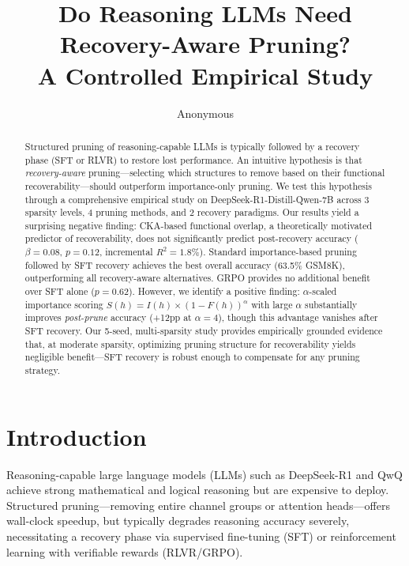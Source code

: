 \documentclass[11pt,a4paper]{article}
\title{Do Reasoning LLMs Need Recovery-Aware Pruning?\\A Controlled Empirical Study}
\author{Anonymous}
\begin{document}
\maketitle

\begin{abstract}
Structured pruning of reasoning-capable LLMs is typically followed by a recovery phase (SFT or RLVR) to restore lost performance. An intuitive hypothesis is that \emph{recovery-aware} pruning---selecting which structures to remove based on their functional recoverability---should outperform importance-only pruning. We test this hypothesis through a comprehensive empirical study on DeepSeek-R1-Distill-Qwen-7B across 3 sparsity levels, 4 pruning methods, and 2 recovery paradigms. Our results yield a surprising negative finding: CKA-based functional overlap, a theoretically motivated predictor of recoverability, does not significantly predict post-recovery accuracy ($\beta=0.08$, $p=0.12$, incremental $R^2=1.8\%$). Standard importance-based pruning followed by SFT recovery achieves the best overall accuracy (63.5\% GSM8K), outperforming all recovery-aware alternatives. GRPO provides no additional benefit over SFT alone ($p=0.62$). However, we identify a positive finding: $\alpha$-scaled importance scoring $S(h)=I(h)\times(1{-}F(h))^\alpha$ with large $\alpha$ substantially improves \emph{post-prune} accuracy (+12pp at $\alpha{=}4$), though this advantage vanishes after SFT recovery. Our 5-seed, multi-sparsity study provides empirically grounded evidence that, at moderate sparsity, optimizing pruning structure for recoverability yields negligible benefit---SFT recovery is robust enough to compensate for any pruning strategy.
\end{abstract}

\section{Introduction}
\label{sec:intro}

Reasoning-capable large language models (LLMs) such as DeepSeek-R1 \cite{deepseekai2025} and QwQ \cite{qwq2025} achieve strong mathematical and logical reasoning but are expensive to deploy. Structured pruning---removing entire channel groups or attention heads---offers wall-clock speedup, but typically degrades reasoning accuracy severely, necessitating a recovery phase via supervised fine-tuning (SFT) or reinforcement learning with verifiable rewards (RLVR/GRPO).
\end{document}
